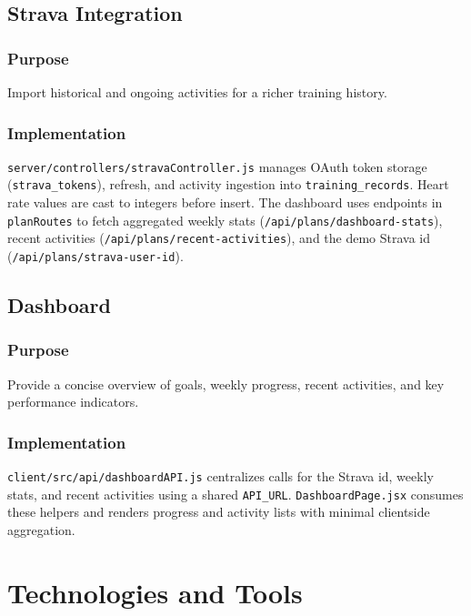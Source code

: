 \subsection{Strava Integration}
\subsubsection{Purpose}
Import historical and ongoing activities for a richer training history.

\subsubsection{Implementation}
\verb|server/controllers/stravaController.js| manages OAuth token storage (\verb|strava_tokens|), refresh, and activity ingestion into \verb|training_records|. Heart rate values are cast to integers before insert. The dashboard uses endpoints in \verb|planRoutes| to fetch aggregated weekly stats (\verb|/api/plans/dashboard-stats|), recent activities (\verb|/api/plans/recent-activities|), and the demo Strava id (\verb|/api/plans/strava-user-id|).

\subsection{Dashboard}
\subsubsection{Purpose}
Provide a concise overview of goals, weekly progress, recent activities, and key performance indicators.

\subsubsection{Implementation}
\verb|client/src/api/dashboardAPI.js| centralizes calls for the Strava id, weekly stats, and recent activities using a shared \verb|API_URL|. \verb|DashboardPage.jsx| consumes these helpers and renders progress and activity lists with minimal client\-side aggregation.

\section{Technologies and Tools}
